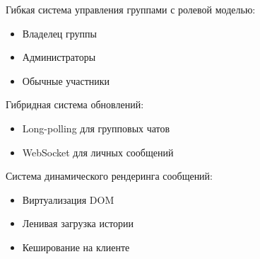 Гибкая система управления группами с ролевой моделью:
\begin{itemize}
	\item Владелец группы
	\item Администраторы
	\item Обычные участники
\end{itemize}
		
Гибридная система обновлений:
\begin{itemize}
	\item Long-polling для групповых чатов
	\item WebSocket для личных сообщений
\end{itemize}
	
Система динамического рендеринга сообщений:
\begin{itemize}
	\item Виртуализация DOM
	\item Ленивая загрузка истории
	\item Кеширование на клиенте
\end{itemize}

